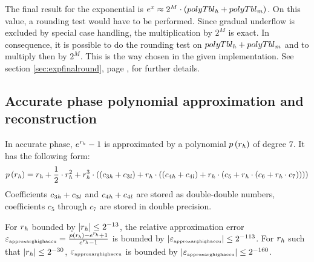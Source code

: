 The final result for the exponential is $e^x \approx 2^M \cdot \left(
polyTbl_\hi + polyTbl_\mi \right)$.  On this value, a rounding test
would have to be performed. Since gradual underflow is excluded by
special case handling, the multiplication by $2^M$ is exact. In
consequence, it is possible to do the rounding test on $polyTbl_\hi +
polyTbl_\mi$ and to multiply then by $2^M$. This is the way chosen in
the given implementation. See section \ref{sec:expfinalround}, page
\pageref{sec:expfinalround}, for further details.

\subsection{Accurate phase polynomial approximation and reconstruction}
In accurate phase, $e^{r_\hi} - 1$ is approximated by a polynomial
$p\left( r_\hi \right)$ of degree $7$. It has the following form:
$$p\left( r_\hi \right) = r_\hi + \frac{1}{2} \cdot r_\hi^2 + r_\hi^3
\cdot \left( \left( c_{3\hi} + c_{3\lo} \right) + r_\hi \cdot \left(
\left( c_{4\hi} + c_{4\lo} \right) + r_\hi \cdot \left( c_5 + r_\hi
\cdot \left( c_6 + r_\hi \cdot c_7 \right) \right) \right) \right)$$
Coefficients $c_{3\hi} + c_{3\lo}$ and $c_{4\hi} + c_{4\lo}$ are
stored as double-double numbers, coefficients $c_5$ through $c_7$ are
stored in double precision.

For $r_\hi$ bounded by $\left \vert r_\hi \right \vert \leq 2^{-13}$,
the relative approximation error $\epsilon_{\mbox{\tiny
approxarghighaccu}} = \frac{p\left( r_\hi \right) - e^{r_\hi} +
1}{e^{r_\hi} - 1}$ is bounded by $\left \vert \epsilon_{\mbox{\tiny
approxarghighaccu}} \right \vert \leq 2^{-113}$.  For $r_\hi$ such
that $\left \vert r_\hi \right \vert \leq 2^{-30}$,
$\epsilon_{\mbox{\tiny approxarghighaccu}}$ is bounded by $\left \vert
\epsilon_{\mbox{\tiny approxarghighaccu}} \right \vert \leq 2^{-160}$.

